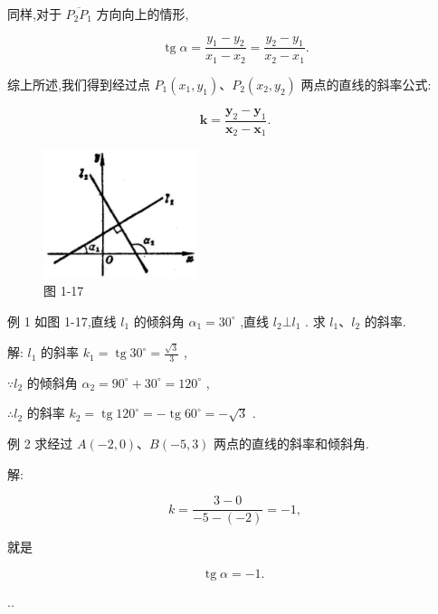 \documentclass[lang=cn,newtx,10pt,scheme=chinese]{elegantbook}
\begin{document}
同样,对于 \(\overline{{P}_{2}{P}_{1}}\) 方向向上的情形,

\[
  \operatorname{tg}\alpha = \frac{{y}_{1} - {y}_{2}}{{x}_{1} - {x}_{2}} = \frac{{y}_{2} - {y}_{1}}{{x}_{2} - {x}_{1}}.
\]

\begin{corollary}[直线上两点的斜率公式]
综上所述,我们得到经过点 \({P}_{1}\left( {{x}_{1},{y}_{1}}\right) \text{、}{P}_{2}\left( {{x}_{2},{y}_{2}}\right)\) 两点的直线的斜率公式:

\[
  \mathbf{k} = \frac{{\mathbf{y}}_{2} - {\mathbf{y}}_{1}}{{\mathbf{x}}_{2} - {\mathbf{x}}_{1}}.
\]
\end{corollary}

\begin{figure}[h]
  \centering
  \includegraphics[max width=0.4\textwidth]{images/01912cc2-ffb6-728e-9ae7-b113ff05c64b_21_706247.jpg}
  \caption{图 1-17}
\end{figure}



例 1 如图 1-17,直线 \({l}_{1}\) 的倾斜角 \({\alpha }_{1} = {30}^{ \circ }\) ,直线 \({l}_{2} \bot {l}_{1}\) . 求 \({l}_{1}\text{、}{l}_{2}\) 的斜率.

解: \({l}_{1}\) 的斜率 \({k}_{1} = \operatorname{tg}{30}^{ \circ } = \frac{\sqrt{3}}{3}\) ,

\(\because {l}_{2}\) 的倾斜角 \({\alpha }_{2} = {90}^{ \circ } + {30}^{ \circ } = {120}^{ \circ }\) ,

\(\therefore {l}_{2}\) 的斜率 \({k}_{2} = \operatorname{tg}{120}^{ \circ } = - \operatorname{tg}{60}^{ \circ } = - \sqrt{3}\) .

例 2 求经过 \(A\left( {-2,0}\right) \text{、}B\left( {-5,3}\right)\) 两点的直线的斜率和倾斜角.

解:

\[
  k = \frac{3 - 0}{-5 - \left( {-2}\right) } = - 1,
\]

就是

\[
  \operatorname{tg}\alpha = - 1\text{. }
\]

..
\end{document}

